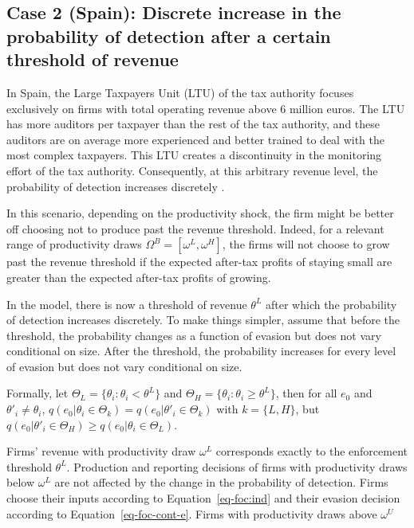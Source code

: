 \documentclass[
  12pt]{article}
\theoremstyle{definition}
\theoremstyle{remark}
\begin{document}
\subsection{Case 2 (Spain): Discrete increase in the probability of
detection after a certain threshold of
revenue}\label{case-2-spain-discrete-increase-in-the-probability-of-detection-after-a-certain-threshold-of-revenue}

In Spain, the Large Taxpayers Unit (LTU) of the tax authority focuses
exclusively on firms with total operating revenue above 6 million euros.
The LTU has more auditors per taxpayer than the rest of the tax
authority, and these auditors are on average more experienced and better
trained to deal with the most complex taxpayers. This LTU creates a
discontinuity in the monitoring effort of the tax authority.
Consequently, at this arbitrary revenue level, the probability of
detection increases discretely \citep{Almunia2018}.

In this scenario, depending on the productivity shock, the firm might be
better off choosing not to produce past the revenue threshold. Indeed,
for a relevant range of productivity draws
\(\Omega^B=[\omega^L, \omega^H]\), the firms will not choose to grow
past the revenue threshold if the expected after-tax profits of staying
small are greater than the expected after-tax profits of growing.

In the model, there is now a threshold of revenue \(\theta^L\) after
which the probability of detection increases discretely. To make things
simpler, assume that before the threshold, the probability changes as a
function of evasion but does not vary conditional on size. After the
threshold, the probability increases for every level of evasion but does
not vary conditional on size.

Formally, let \(\Theta_{L} = \{\theta_i : \theta_{i} < \theta^L \}\) and
\(\Theta_{H} = \{\theta_i : \theta_{i} \ge \theta^L \}\), then for all
\(e_0\) and \(\theta'_i\not=\theta_i\),
\(q(e_0|\theta_i \in \Theta_k)=q(e_0|\theta'_i \in \Theta_k)\) with
\(k=\{L,H\}\), but
\(q(e_0|\theta'_i \in \Theta_H)\ge q(e_0|\theta_i \in \Theta_L)\).

Firms' revenue with productivity draw \(\omega^L\) corresponds exactly
to the enforcement threshold \(\theta^L\). Production and reporting
decisions of firms with productivity draws below \(\omega^L\) are not
affected by the change in the probability of detection. Firms choose
their inputs according to Equation~\ref{eq-foc:ind} and their evasion
decision according to Equation~\ref{eq-foc-cont-e}. Firms with
productivity draws above \(\omega^U\)
\end{document}
